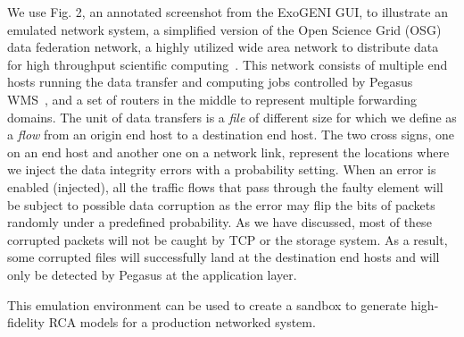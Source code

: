 We use Fig. 2, an annotated screenshot from the ExoGENI GUI, to illustrate an emulated network system, a simplified version of the Open Science Grid (OSG) data federation network, a highly utilized wide area network to distribute data for high throughput scientific computing~\cite{OSG:web}. This network consists of multiple end hosts running the data transfer and computing jobs controlled by Pegasus WMS~\cite{deelman-fgcs-2015}, and a set of routers in the middle to represent multiple forwarding domains. The unit of data transfers is a {\it file} of different size for which we define as a {\it flow} from an origin end host to a destination end host. The two cross signs, one on an 
end host and another one on a network link, represent the locations where we inject the data integrity errors with a probability setting. When an error is enabled (injected), all the traffic flows that pass through the faulty element will be subject to possible data corruption as the error may flip the bits of packets randomly under a predefined probability. As we have discussed, most of these corrupted packets will not be caught by TCP or the storage system. As a result, some corrupted files will successfully land at the destination end hosts and will only be detected by Pegasus at the application layer. 

This emulation environment can be used to create a sandbox to generate high-fidelity RCA models for a production networked system. 